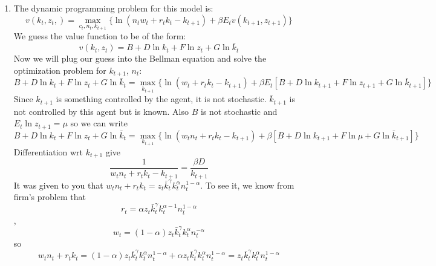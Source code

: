 \documentclass[11pt]{article}
\begin{document}
\begin{enumerate}
\begin{enumerate}
\item The dynamic programming problem for this model is: 
\begin{equation*}
v(k_{t},z_{t},)=\underset{c_{t},n_{t},k_{t+1}}{\max }\{\ln \left(
n_{t}w_{t}+r_{t}k_{t}-k_{t+1}\right) +\beta E_{t}v(k_{t+1},z_{t+1})\}
\end{equation*}%
We guess the value function to be of the form: 
\begin{equation*}
v(k_{t},z_{t})=B+D\ln k_{t}+F\ln z_{t}+G\ln \bar{k}_{t}
\end{equation*}%
Now we will plug our guess into the Bellman equation and solve the
optimization problem for $k_{t+1}$, $n_{t}$: 
\begin{equation*}
B+D\ln k_{t}+F\ln z_{t}+G\ln \bar{k}_{t}=\underset{k_{t+1}}{\max }\{\ln
\left( w_{t}+r_{t}k_{t}-k_{t+1}\right) +\beta E_{t}\left[ B+D\ln
k_{t+1}+F\ln z_{t+1}+G\ln \bar{k}_{t+1}\right] \}
\end{equation*}%
Since $k_{t+1}$ is something controlled by the agent, it is not stochastic. $%
\bar{k}_{t+1}$ is not controlled by this agent but is known. Also $B$ is not
stochastic and $E_{t}\ln z_{t+1}=\mu $ so we can write 
\begin{equation*}
B+D\ln k_{t}+F\ln z_{t}+G\ln \bar{k}_{t}=\underset{k_{t+1}}{\max }\{\ln
\left( w_{t}n_{t}+r_{t}k_{t}-k_{t+1}\right) +\beta \left[ B+D\ln
k_{t+1}+F\ln \mu +G\ln \bar{k}_{t+1}\right] \}
\end{equation*}%
Differentiation wrt $k_{t+1}$ give 
\begin{equation*}
\frac{1}{w_{t}n_{t}+r_{t}k_{t}-k_{t+1}}=\frac{\beta D}{k_{t+1}}
\end{equation*}%
It was given to you that $w_{t}n_{t}+r_{t}k_{t}=z_{t}\bar{k}_{t}^{\gamma
}k_{t}^{\alpha }n_{t}^{1-\alpha }.$ To see it, we know from firm's problem
that%
\begin{equation*}
r_{t}=\alpha z_{t}\bar{k}_{t}^{\gamma }k_{t}^{\alpha -1}n_{t}^{1-\alpha }
\end{equation*}%
, 
\begin{equation*}
w_{t}=\left( 1-\alpha \right) z_{t}\bar{k}_{t}^{\gamma }k_{t}^{\alpha
}n_{t}^{-\alpha }
\end{equation*}%
so 
\begin{equation*}
w_{t}n_{t}+r_{t}k_{t}=\left( 1-\alpha \right) z_{t}\bar{k}_{t}^{\gamma
}k_{t}^{\alpha }n_{t}^{1-\alpha }+\alpha z_{t}\bar{k}_{t}^{\gamma
}k_{t}^{\alpha }n_{t}^{1-\alpha }=z_{t}\bar{k}_{t}^{\gamma }k_{t}^{\alpha
}n_{t}^{1-\alpha }
\end{equation*}%

\end{enumerate}
\end{enumerate}
\end{document}
